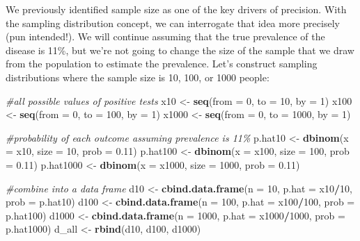 \documentclass[
]{book}
\newenvironment{Shaded}{\begin{snugshade}}{\end{snugshade}}
\newcommand{\AttributeTok}[1]{\textcolor[rgb]{0.13,0.29,0.53}{#1}}
\newcommand{\CommentTok}[1]{\textcolor[rgb]{0.56,0.35,0.01}{\textit{#1}}}
\newcommand{\DecValTok}[1]{\textcolor[rgb]{0.00,0.00,0.81}{#1}}
\newcommand{\FloatTok}[1]{\textcolor[rgb]{0.00,0.00,0.81}{#1}}
\newcommand{\FunctionTok}[1]{\textcolor[rgb]{0.13,0.29,0.53}{\textbf{#1}}}
\newcommand{\NormalTok}[1]{#1}
\newcommand{\OtherTok}[1]{\textcolor[rgb]{0.56,0.35,0.01}{#1}}
\newcommand{\SpecialCharTok}[1]{\textcolor[rgb]{0.81,0.36,0.00}{\textbf{#1}}}
\begin{document}
We previously identified sample size as one of the key drivers of precision. With the sampling distribution concept, we can interrogate that idea more precisely (pun intended!). We will continue assuming that the true prevalence of the disease is 11\%, but we're not going to change the size of the sample that we draw from the population to estimate the prevalence. Let's construct sampling distributions where the sample size is 10, 100, or 1000 people:

\begin{Shaded}
\begin{Highlighting}[]
\CommentTok{\#all possible values of positive tests}
\NormalTok{x10 }\OtherTok{\textless{}{-}} \FunctionTok{seq}\NormalTok{(}\AttributeTok{from =} \DecValTok{0}\NormalTok{, }\AttributeTok{to =} \DecValTok{10}\NormalTok{, }\AttributeTok{by =} \DecValTok{1}\NormalTok{)}
\NormalTok{x100 }\OtherTok{\textless{}{-}} \FunctionTok{seq}\NormalTok{(}\AttributeTok{from =} \DecValTok{0}\NormalTok{, }\AttributeTok{to =} \DecValTok{100}\NormalTok{, }\AttributeTok{by =} \DecValTok{1}\NormalTok{)}
\NormalTok{x1000 }\OtherTok{\textless{}{-}} \FunctionTok{seq}\NormalTok{(}\AttributeTok{from =} \DecValTok{0}\NormalTok{, }\AttributeTok{to =} \DecValTok{1000}\NormalTok{, }\AttributeTok{by =} \DecValTok{1}\NormalTok{)}

\CommentTok{\#probability of each outcome assuming prevalence is 11\%}
\NormalTok{p.hat10 }\OtherTok{\textless{}{-}} \FunctionTok{dbinom}\NormalTok{(}\AttributeTok{x =}\NormalTok{ x10, }\AttributeTok{size =} \DecValTok{10}\NormalTok{, }\AttributeTok{prob =} \FloatTok{0.11}\NormalTok{)}
\NormalTok{p.hat100 }\OtherTok{\textless{}{-}} \FunctionTok{dbinom}\NormalTok{(}\AttributeTok{x =}\NormalTok{ x100, }\AttributeTok{size =} \DecValTok{100}\NormalTok{, }\AttributeTok{prob =} \FloatTok{0.11}\NormalTok{)}
\NormalTok{p.hat1000 }\OtherTok{\textless{}{-}} \FunctionTok{dbinom}\NormalTok{(}\AttributeTok{x =}\NormalTok{ x1000, }\AttributeTok{size =} \DecValTok{1000}\NormalTok{, }\AttributeTok{prob =} \FloatTok{0.11}\NormalTok{)}

\CommentTok{\#combine into a data frame}
\NormalTok{d10 }\OtherTok{\textless{}{-}} \FunctionTok{cbind.data.frame}\NormalTok{(}\AttributeTok{n =} \DecValTok{10}\NormalTok{, }\AttributeTok{p.hat =}\NormalTok{ x10}\SpecialCharTok{/}\DecValTok{10}\NormalTok{, }\AttributeTok{prob =}\NormalTok{ p.hat10)}
\NormalTok{d100 }\OtherTok{\textless{}{-}} \FunctionTok{cbind.data.frame}\NormalTok{(}\AttributeTok{n =} \DecValTok{100}\NormalTok{, }\AttributeTok{p.hat =}\NormalTok{ x100}\SpecialCharTok{/}\DecValTok{100}\NormalTok{, }\AttributeTok{prob =}\NormalTok{ p.hat100)}
\NormalTok{d1000 }\OtherTok{\textless{}{-}} \FunctionTok{cbind.data.frame}\NormalTok{(}\AttributeTok{n =} \DecValTok{1000}\NormalTok{, }\AttributeTok{p.hat =}\NormalTok{ x1000}\SpecialCharTok{/}\DecValTok{1000}\NormalTok{, }\AttributeTok{prob =}\NormalTok{ p.hat1000)}
\NormalTok{d\_all }\OtherTok{\textless{}{-}} \FunctionTok{rbind}\NormalTok{(d10, d100, d1000)}
\end{Highlighting}
\end{Shaded}
\end{document}
